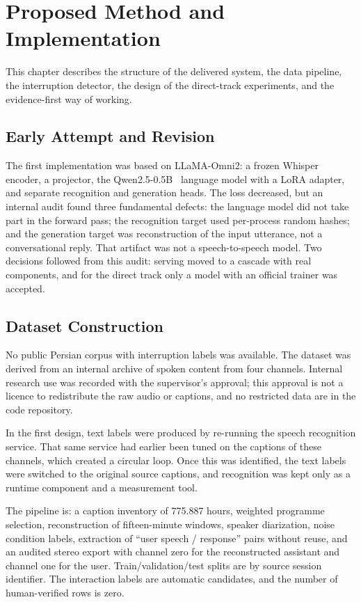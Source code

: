 \chapter{Proposed Method and Implementation}
\label{ch:method}

This chapter describes the structure of the delivered system, the data
pipeline, the interruption detector, the design of the direct-track experiments,
and the evidence-first way of working.

\section{Early Attempt and Revision}
\label{sec:early-attempt}

The first implementation was based on LLaMA-Omni2: a frozen Whisper encoder, a
projector, the Qwen2.5-0.5B~\cite{qwen2025qwen25} language model with a LoRA
adapter, and separate recognition and generation heads. The loss decreased, but
an internal audit found three fundamental defects: the language model did not
take part in the forward pass; the recognition target used per-process random
hashes; and the generation target was reconstruction of the input utterance,
not a conversational reply. That artifact was not a speech-to-speech model. Two
decisions followed from this audit: serving moved to a cascade with real
components, and for the direct track only a model with an official trainer was
accepted.

\section{Dataset Construction}
\label{sec:data}

No public Persian corpus with interruption labels was available. The dataset was
derived from an internal archive of spoken content from four channels. Internal
research use was recorded with the supervisor's approval; this approval is not a
licence to redistribute the raw audio or captions, and no restricted data are in
the code repository.

In the first design, text labels were produced by re-running the speech
recognition service. That same service had earlier been tuned on the captions of
these channels, which created a circular loop. Once this was identified, the
text labels were switched to the original source captions, and recognition was
kept only as a runtime component and a measurement tool.

The pipeline is: a caption inventory of 775.887 hours, weighted programme
selection, reconstruction of fifteen-minute windows, speaker diarization, noise
condition labels, extraction of ``user speech / response'' pairs without reuse,
and an audited stereo export with channel zero for the reconstructed assistant
and channel one for the user. Train/validation/test splits are by source session
identifier. The interaction labels are automatic candidates, and the number of
human-verified rows is zero.

